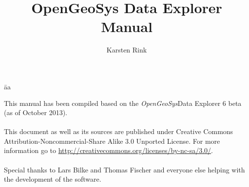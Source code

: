 \documentclass[11pt,twoside,a4paper]{book}
\title{{\LARGE OpenGeoSys Data Explorer}\\[0.5em] Manual}
\author{Karsten Rink}
\newcommand{\ogs}{\emph{OpenGeoSys}}
\begin{document}
\pagestyle{empty}
\maketitle
\newpage

\vspace*{12cm}
\begin{tabbing}
\hspace*{6cm}\=aa\kill
\begin{minipage}[t]{0.62\textwidth}
\noindent This manual has been compiled based on the \ogs Data Explorer 6 beta \\
(as of October 2013).\\
\\
This document as well as its sources are published under Creative Commons Attribution-Noncommercial-Share Alike 3.0 Un\-por\-ted License. For more information go to \url{http://creativecommons.org/licenses/by-nc-sa/3.0/}. \\
\\
\noindent Special thanks to Lars Bilke and Thomas Fischer and everyone else helping with the development of the software.
\end{minipage}
\> \\
\end{tabbing}

\newpage

\tableofcontents

\cleardoublepage

\pagestyle{fancy}











\appendix

\cleardoublepage
{}
\printindex

\cleardoublepage


\cleardoublepage
\end{document}
